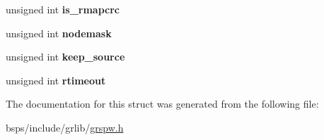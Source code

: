 \begin{DoxyCompactItemize}
\mbox{\label{structspw__config_a266f9d685c31848cd276de15217ffdd5}} 
unsigned int {\bfseries is\+\_\+rmapcrc}
\item 
\mbox{\label{structspw__config_a43450313c3281b9419a289478aca9ec9}} 
unsigned int {\bfseries nodemask}
\item 
\mbox{\label{structspw__config_a7729f0a79fd64f96566a8ad9683db187}} 
unsigned int {\bfseries keep\+\_\+source}
\item 
\mbox{\label{structspw__config_af569a154d0b17af7a56702b9b4162ddb}} 
unsigned int {\bfseries rtimeout}
\end{DoxyCompactItemize}


The documentation for this struct was generated from the following file\+:\begin{DoxyCompactItemize}
\item 
bsps/include/grlib/\mbox{\hyperlink{grspw_8h}{grspw.\+h}}\end{DoxyCompactItemize}
